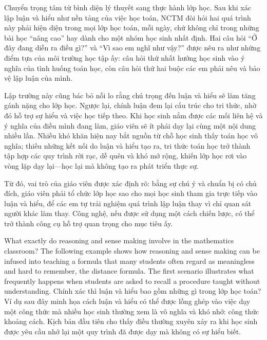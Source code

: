 \documentclass[
  10pt,
  a4paper,
  landscape,
  twoside,
  openany
]{scrbook}
\newcommand{\EN}[1]{#1}
\newcommand{\VI}[1]{#1}
\newcommand{\NOTE}[1]{#1}
\newcounter{example}
\begin{document}
{
\NOTE{Chuyển trọng tâm từ bình diện lý thuyết sang thực hành lớp học. Sau khi xác lập luận và hiểu như nền tảng của việc học toán, NCTM đòi hỏi hai quá trình này phải hiện diện trong mọi lớp học toán, mỗi ngày, chứ không chỉ trong những bài học ``nâng cao'' hay dành cho một nhóm học sinh nhất định. Hai câu hỏi ``Ở đây đang diễn ra điều gì?'' và ``Vì sao em nghĩ như vậy?'' được nêu ra như những điểm tựa của môi trường học tập ấy: câu hỏi thứ nhất hướng học sinh vào ý nghĩa của tình huống toán học, còn câu hỏi thứ hai buộc các em phải nêu và bảo vệ lập luận của mình.

Lập trường này cũng bác bỏ nỗi lo rằng chú trọng đến luận và hiểu sẽ làm tăng gánh nặng cho lớp học. Ngược lại, chính luận đem lại cấu trúc cho tri thức, nhờ đó hỗ trợ sự hiểu và việc học tiếp theo. Khi học sinh nắm được các mối liên hệ và ý nghĩa của điều mình đang làm, giáo viên sẽ ít phải dạy lại cùng một nội dung nhiều lần. Nhiều khó khăn hiện nay bắt nguồn từ chỗ học sinh thấy toán học vô nghĩa; thiếu những kết nối do luận và hiểu tạo ra, tri thức toán học trở thành tập hợp các quy trình rời rạc, dễ quên và khó mở rộng, khiến lớp học rơi vào vòng lặp dạy lại---học lại mà không tạo ra phát triển thực sự.

Từ đó, vai trò của giáo viên được xác định rõ: bằng sự chú ý và chuẩn bị có chủ đích, giáo viên phải tổ chức lớp học sao cho mọi học sinh tham gia trực tiếp vào luận và hiểu, để các em tự trải nghiệm quá trình lập luận thay vì chỉ quan sát người khác làm thay. Công nghệ, nếu được sử dụng một cách chiến lược, có thể trở thành công cụ hỗ trợ quan trọng cho mục tiêu ấy.}
}

\TriPara
{
\EN{What exactly do reasoning and sense making involve in the mathematics classroom? The following example shows how reasoning and sense making can be infused into teaching a formula that many students often regard as meaningless and hard to remember, the distance formula. The first scenario illustrates what frequently happens when students are asked to recall a procedure taught without understanding.}
}
{
\VI{Chính xác thì luận và hiểu bao gồm những gì trong lớp học toán? Ví dụ sau đây minh họa cách luận và hiểu có thể được lồng ghép vào việc dạy một công thức mà nhiều học sinh thường xem là vô nghĩa và khó nhớ: công thức khoảng cách. Kịch bản đầu tiên cho thấy điều thường xuyên xảy ra khi học sinh được yêu cầu nhớ lại một quy trình đã được dạy mà không có sự hiểu biết.}
}
{
\NOTE{}
}
\end{document}
